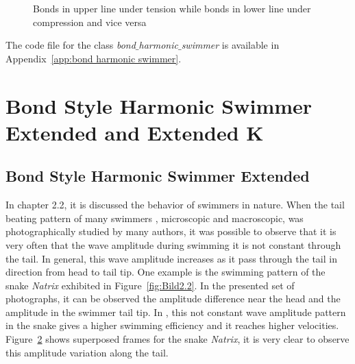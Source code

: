 \begin{figure}[H]
\centering
  \begin{footnotesize}
  
  \caption[Bonds in upper line under tension while bonds in lower line under compression and vice versa]{Bonds in upper line under tension while bonds in lower line under compression and vice versa}
  \label{fig:Bild3.4}
  \end{footnotesize}
\end{figure} 

The code file for the class \textit{bond$\_$harmonic$\_$swimmer} is available in Appendix~\ref{app:bond harmonic swimmer}. 

\section{Bond Style Harmonic Swimmer Extended and Extended K}
\label{sec:section 4}

\subsection{Bond Style Harmonic Swimmer Extended }
\label{sec:section 1}

In chapter 2.2, it is discussed the behavior of swimmers in nature. When the tail beating pattern of many swimmers , microscopic and macroscopic, was photographically studied
by many authors, it was possible to observe that it is very often that the wave amplitude during swimming it is not constant through the tail. In general, this wave amplitude increases
as it pass through the tail in direction from head to tail tip. One example is the swimming pattern of the snake \textit{Natrix} exhibited in Figure~\ref{fig:Bild2.2}. In the presented set
of photographs, it can be observed the amplitude difference near the head and the amplitude in the swimmer tail tip. In \cite{taylor_analysis_1952}, this not constant wave amplitude
pattern in the snake gives a higher swimming efficiency and it reaches higher velocities. Figure~\ref{fig:Bild3.5} shows superposed frames for the snake \textit{Natrix}, it is very
clear to observe this amplitude variation along the tail.\par

\begin{figure}[H]
\centering
  \begin{footnotesize}
  
  \caption[]{}
  \label{fig:Bild3.5}
  \end{footnotesize}
\end{figure} 

